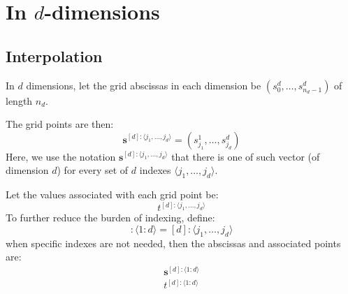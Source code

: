 \documentclass[11pt]{article}
\newcommand{\sbf}{\boldsymbol{s}}
\begin{document}
\section{In $d$-dimensions}



\subsection{Interpolation}


In $d$ dimensions, let the grid abscissas in each dimension be $(s_0^d, \dots, s_{n_d-1}^d)$ of length $n_d$.

The grid points are then:
\begin{equation}
\sbf^{[d] : \langle j_1,\dots,j_d \rangle} = \left ( s_{j_1}^1, \dots, s_{j_d}^d  \right )
\end{equation}
Here, we use the notation $\sbf^{[d] : \langle j_1,\dots,j_d \rangle}$ that there is one of such vector (of dimension $d$) for every set of $d$ indexes $\langle j_1,\dots,j_d \rangle$.

Let the values associated with each grid point be:
\begin{equation}
t^{[d] : \langle j_1,\dots,j_d \rangle}
\end{equation}
To further reduce the burden of indexing, define:
\begin{equation}
[d]: \langle 1:d \rangle  = [d]: \langle j_1, \dots, j_d \rangle
\end{equation}
when specific indexes are not needed, then the abscissas and associated points are:
\begin{equation*}
\begin{split}
\sbf^{[d]: \langle 1:d \rangle} \\
t^{[d]: \langle 1:d \rangle}
\end{split}
\end{equation*}
\end{document}
